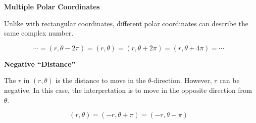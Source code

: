 \documentclass{ximera}
\begin{document}
\begin{warning} \textbf{\textcolor{red!80!black}{Multiple Polar Coordinates}}


Unlike with rectangular coordinates, different polar coordinates can describe the same complex number.

\[
 \cdots = (r, \theta - 2\pi) = (r, \theta) = (r, \theta + 2\pi) = (r, \theta + 4\pi) = \cdots
\]

\end{warning}






\begin{warning} \textbf{\textcolor{red!80!black}{Negative ``Distance''}}


The $r$ in $(r, \theta)$ is the distance to move in the $\theta$-direction.  However, $r$ can be negative. In this case, the interpretation is to move in the opposite direction from $\theta$.

\[
 (r, \theta) = (-r, \theta + \pi) = (-r, \theta - \pi)
\]

\end{warning}
\end{document}
